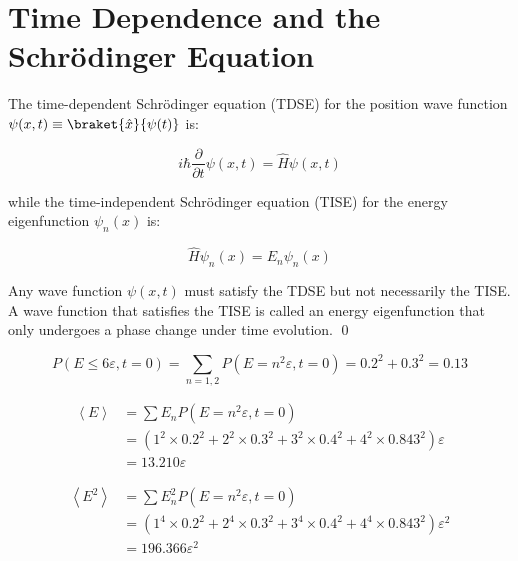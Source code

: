 \documentclass[12pt]{article}
\begin{document}



\pagebreak
\section*{Time Dependence and the Schr\"odinger Equation}


The time-dependent Schr\"odinger equation (TDSE) for the position wave function $\psi(x,t) \equiv \braket{\hat{x}}{\psi(t)}$ is:

\begin{equation}
    i\hbar \frac{\partial}{\partial t} \psi(x,t) = \hat{H} \psi(x,t)
\end{equation}

while the time-independent Schr\"odinger equation (TISE) for the energy eigenfunction $\psi_{n}(x)$ is:

\begin{equation}
    \hat{H} \psi_{n}(x) = E_{n} \psi_{n}(x)
\end{equation}

Any wave function $\psi(x,t)$ must satisfy the TDSE but not necessarily the TISE. A wave function that satisfies the TISE is called an energy eigenfunction that only undergoes a phase change under time evolution.
\qed






\begin{equation}
    P(E \le 6\varepsilon, t = 0) = \sum_{n = 1, 2} P(E = n^{2}\varepsilon, t = 0) = 0.2^{2} + 0.3^{2} = 0.13
\end{equation}


\begin{equation}
\begin{split}
    \left\langle E \right\rangle &= \sum E_{n} P(E = n^{2}\varepsilon, t = 0) \\
    &= \left( 1^{2} \times 0.2^{2} + 2^{2} \times 0.3^{2} + 3^{2} \times 0.4^{2} + 4^{2} \times 0.843^{2} \right) \varepsilon \\
    &= 13.210 \varepsilon
\end{split}
\end{equation}

\begin{equation}
\begin{split}
    \left\langle E^{2} \right\rangle &= \sum E_{n}^{2} P(E = n^{2}\varepsilon, t = 0) \\
    &= \left( 1^{4} \times 0.2^{2} + 2^{4} \times 0.3^{2} + 3^{4} \times 0.4^{2} + 4^{4} \times 0.843^{2} \right) \varepsilon^{2} \\
    &= 196.366 \varepsilon^{2}
\end{split}
\end{equation}
\end{document}
